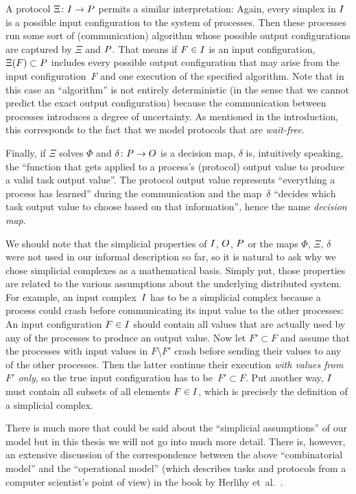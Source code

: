 A protocol $\Xi\colon I\to P$ permits a similar interpretation:
Again, every simplex in $I$ is a possible input configuration to
the system of processes. Then these processes run some sort of
(communication) algorithm whose possible output configurations are
captured by $\Xi$ and $P$. That means if $F\in I$ is an input
configuration, $\Xi(F) \subset P$ includes every possible output
configuration that may arise from the input configuration~$F$ and
one execution of the specified algorithm. Note that in this case
an \enquote{algorithm} is not entirely deterministic (in the sense
that we cannot predict the exact output configuration) because the
communication between processes introduces a degree of uncertainty.
As mentioned in the introduction, this corresponds to the fact that
we model protocols that are \emph{wait-free}.

Finally, if $\Xi$ solves $\Phi$ and $\delta\colon P\to O$ is a decision
map, $\delta$ is, intuitively speaking, the \enquote{function that
gets applied to a process's (protocol) output value to produce a valid
task output value}. The protocol output value represents
\enquote{everything a process has learned} during the communication
and the map~$\delta$ \enquote{decides which task output value to
choose based on that information}, hence the name \emph{decision map}.

We should note that the simplicial properties of $I$, $O$, $P$
or the maps $\Phi$, $\Xi$, $\delta$ were not used in our informal
description so far, so it is natural to ask why we chose simplicial
complexes as a mathematical basis. Simply put, those properties are
related to the various assumptions about the underlying distributed
system. For example, an input complex~$I$ has to be a simplicial 
complex because a process could crash before communicating its input
value to the other processes: An input configuration $F\in I$
should contain all values that are actually used by any of
the processes to produce an output value. Now let $F'\subset F$ and
assume that the processes with input values in $F\setminus F'$ crash
before sending their values to any of the other processes. Then the
latter continue their execution \emph{with values from~$F'$ only}, so
the true input configuration has to be~$F'\subset F$. Put another way,
$I$ must contain all subsets of all elements $F\in I$, which is
precisely the definition of a simplicial complex.

There is much more that could be said about the \enquote{simplicial
assumptions} of our model but in this thesis we will not go into much more
detail. There is, however, an extensive discussion of the
correspondence between the above \enquote{combinatorial model} and the
\enquote{operational model} (which describes tasks and protocols from
a computer scientist's point of view) in the book by
Herlihy et~al.~\cite[Ch.\,4]{bookc:herlihyetal13}.

